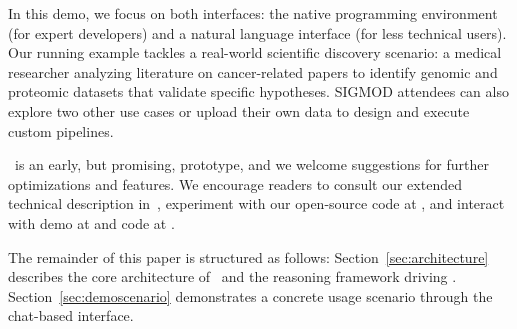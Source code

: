 In this demo, we focus on both interfaces: the native programming environment (for expert developers) and a natural language interface (for less technical users). Our running example tackles a real-world scientific discovery scenario: a medical researcher analyzing literature on cancer-related papers to identify genomic and proteomic datasets that validate specific hypotheses. SIGMOD attendees can also explore two other use cases or upload their own data to design and execute custom pipelines.

\sys\ is an early, but promising, prototype, and we welcome suggestions for further optimizations and features. We encourage readers to consult our extended technical description in~\cite{palimpzestCIDR}, experiment with our open-source \sys{} code at \systemurl, and interact with \chat{} demo at \demourl and code at \chatcode.

The remainder of this paper is structured as follows:  
Section~\ref{sec:architecture} describes the core architecture of \sys\ and the reasoning framework driving \chat.  
Section~\ref{sec:demoscenario} demonstrates a concrete usage scenario through the chat-based interface.
